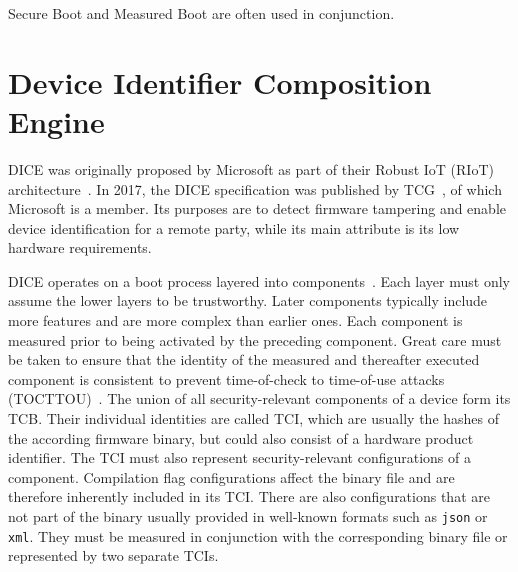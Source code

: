 Secure Boot and Measured Boot are often used in conjunction.

\section{Device Identifier Composition Engine}

\Ac{DICE} was originally proposed by Microsoft as part of their Robust IoT (RIoT) architecture~\cite{England2016}.
In 2017, the DICE specification was published by \ac{TCG}~\cite{tcg-microsoft-tpm}, of which Microsoft is a member.
Its purposes are to detect firmware tampering and enable device identification for a remote party, while its main attribute is its low hardware requirements.


DICE operates on a boot process layered into components~\cite{dice-layering-arch}.
Each layer must only assume the lower layers to be trustworthy.
Later components typically include more features and are more complex than earlier ones.
Each component is measured prior to being activated by the preceding component.
Great care must be taken to ensure that the identity of the measured and thereafter executed component is consistent to prevent time-of-check to time-of-use attacks (TOCTTOU)~\cite{Hristozov2022, Carpent2018}.
The union of all security-relevant components of a device form its \ac{TCB}.
Their individual identities are called \ac{TCI}, which are usually the hashes of the according firmware binary, but could also consist of a hardware product identifier.
The TCI must also represent security-relevant configurations of a component.
Compilation flag configurations affect the binary file and are therefore inherently included in its TCI\@.
There are also configurations that are not part of the binary usually provided in well-known formats such as \texttt{json} or \texttt{xml}.
They must be measured in conjunction with the corresponding binary file or represented by two separate \acp{TCI}.


